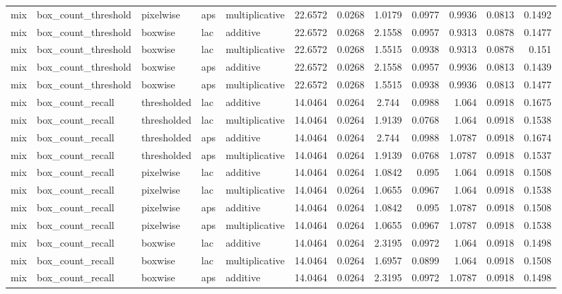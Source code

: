 \begin{table*}[htbp]
\begin{tabular}{@{}lllll rrcrrcr@{}}
mix & box\_count\_threshold & pixelwise & aps & multiplicative & 22.6572 & 0.0268 & 1.0179 & 0.0977 & 0.9936 & 0.0813 & 0.1492 \\
mix & box\_count\_threshold & boxwise & lac & additive & 22.6572 & 0.0268 & 2.1558 & 0.0957 & 0.9313 & 0.0878 & 0.1477 \\
mix & box\_count\_threshold & boxwise & lac & multiplicative & 22.6572 & 0.0268 & 1.5515 & 0.0938 & 0.9313 & 0.0878 & 0.151 \\
mix & box\_count\_threshold & boxwise & aps & additive & 22.6572 & 0.0268 & 2.1558 & 0.0957 & 0.9936 & 0.0813 & 0.1439 \\
mix & box\_count\_threshold & boxwise & aps & multiplicative & 22.6572 & 0.0268 & 1.5515 & 0.0938 & 0.9936 & 0.0813 & 0.1477 \\
mix & box\_count\_recall & thresholded & lac & additive & 14.0464 & 0.0264 & 2.744 & 0.0988 & 1.064 & 0.0918 & 0.1675 \\
mix & box\_count\_recall & thresholded & lac & multiplicative & 14.0464 & 0.0264 & 1.9139 & 0.0768 & 1.064 & 0.0918 & 0.1538 \\
mix & box\_count\_recall & thresholded & aps & additive & 14.0464 & 0.0264 & 2.744 & 0.0988 & 1.0787 & 0.0918 & 0.1674 \\
mix & box\_count\_recall & thresholded & aps & multiplicative & 14.0464 & 0.0264 & 1.9139 & 0.0768 & 1.0787 & 0.0918 & 0.1537 \\
mix & box\_count\_recall & pixelwise & lac & additive & 14.0464 & 0.0264 & 1.0842 & 0.095 & 1.064 & 0.0918 & 0.1508 \\
mix & box\_count\_recall & pixelwise & lac & multiplicative & 14.0464 & 0.0264 & 1.0655 & 0.0967 & 1.064 & 0.0918 & 0.1538 \\
mix & box\_count\_recall & pixelwise & aps & additive & 14.0464 & 0.0264 & 1.0842 & 0.095 & 1.0787 & 0.0918 & 0.1508 \\
mix & box\_count\_recall & pixelwise & aps & multiplicative & 14.0464 & 0.0264 & 1.0655 & 0.0967 & 1.0787 & 0.0918 & 0.1538 \\
mix & box\_count\_recall & boxwise & lac & additive & 14.0464 & 0.0264 & 2.3195 & 0.0972 & 1.064 & 0.0918 & 0.1498 \\
mix & box\_count\_recall & boxwise & lac & multiplicative & 14.0464 & 0.0264 & 1.6957 & 0.0899 & 1.064 & 0.0918 & 0.1508 \\
mix & box\_count\_recall & boxwise & aps & additive & 14.0464 & 0.0264 & 2.3195 & 0.0972 & 1.0787 & 0.0918 & 0.1498 \\

\end{tabular}
\end{table*}
